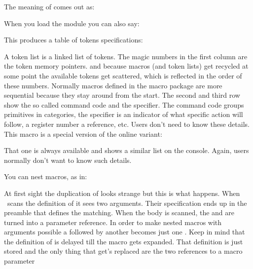 The meaning of \type {\foo} comes out as:

\startnarrower \getbuffer[definition] \stopnarrower

When you load the module  you can also say:

\startbuffer[example]
\luatokentable\foo
\stopbuffer

\typebuffer[example][option=TEX]

This produces a table of tokens specifications:

{\getbuffer[definition]\getbuffer[example]}

A token list is a linked list of tokens. The magic numbers in the first column
are the token memory pointers. and because macros (and token lists) get recycled
at some point the available tokens get scattered, which is reflected in the order
of these numbers. Normally macros defined in the macro package are more sequential
because they stay around from the start. The second and third row show the so
called command code and the specifier. The command code groups primitives in
categories, the specifier is an indicator of what specific action will follow, a
register number a reference, etc. Users don't need to know these details. This
macro is a special version of the online variant:

\starttyping[option=TEX]
\showluatokens\foo
\stoptyping

That one is always available and shows a similar list on the console. Again, users
normally don't want to know such details.

\stopsection

\startsection[title=nesting]

You can nest macros, as in:

\startbuffer
\def\foo#1#2{\def\oof##1{<#1>##1<#2>}}
\stopbuffer

\typebuffer[option=TEX] \getbuffer

At first sight the duplication of \type {#} looks strange but this is what
happens. When \TEX\ scans the definition of \type {\foo} it sees two arguments.
Their specification ends up in the preamble that defines the matching. When the
body is scanned, the  and  are turned into a parameter
reference. In order to make nested macros with arguments possible a \type {#}
followed by another \type {#} becomes just one \type {#}. Keep in mind that the
definition of \type {\oof} is delayed till the macro \type {\foo} gets expanded.
That definition is just stored and the only thing that get's replaced are the two
references to a macro parameter

